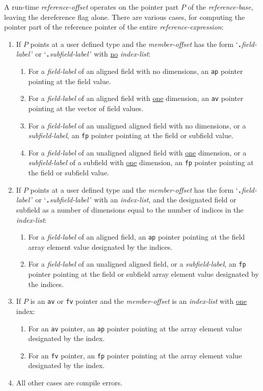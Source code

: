 \documentclass[12pt]{article}
\newcommand{\TT}[1]{{\tt \bfseries #1}}
\begin{document}
A run-time {\em reference-offset} operates on the pointer part $P$
of the {\em reference-base}, leaving the dereference flag
alone.  There are various cases, for computing the
pointer part of the reference pointer of the entire
{\em reference-expression}:\label{FIELD-SELECTION}
\begin{enumerate}

\item If $P$ points at a user defined type and the
{\em member-offset} has the form
`\TT{.}{\em field-label}\,' or `\TT{.}{\em subfield-label}\,' with
\underline{no} {\em index-list}:
\begin{enumerate}
\item For a {\em field-label} of an aligned field with no
dimensions, an {\tt ap} pointer pointing at the field value.
\item For a {\em field-label} of an aligned field with \underline{one}
dimension, an {\tt av} pointer pointing at the vector of field values.
\item For a {\em field-label} of an unaligned aligned field with no
dimensions, or a {\em subfield-label}, an {\tt fp} pointer pointing at the
field or subfield value.
\item For a {\em field-label} of an unaligned aligned field with \underline{one}
dimension, or a {\em subfield-label} of a subfield with \underline{one}
dimension, an {\tt fp} pointer pointing at the
field or subfield value.
\end{enumerate}

\item If $P$ points at a user defined type and the
{\em member-offset} has the form
`\TT{.}{\em field-label}\,' or `\TT{.}{\em subfield-label}\,' with
an {\em index-list}, and the designated field or subfield
as a number of dimensions equal to the number of indices in the
{\em index-list}:
\begin{enumerate}
\item For a {\em field-label} of an aligned field,
an {\tt ap} pointer pointing at the field array element value
designated by the indices.
\item For a {\em field-label} of an unaligned aligned field,
or a {\em subfield-label}, an {\tt fp} pointer pointing at the
field or subfield array element value designated by the indices.
\end{enumerate}

\item If $P$ is an {\tt av} or {\tt fv} pointer and the
{\em member-offset} is an
{\em index-list} with \underline{one} index:
\begin{enumerate}
\item For an {\tt av} pointer,
an {\tt ap} pointer pointing at the array element value
designated by the index.
\item For an {\tt fv} pointer,
an {\tt fp} pointer pointing at the array element value
designated by the index.
\end{enumerate}

\item All other cases are compile errors.

\end{enumerate}
\end{document}
